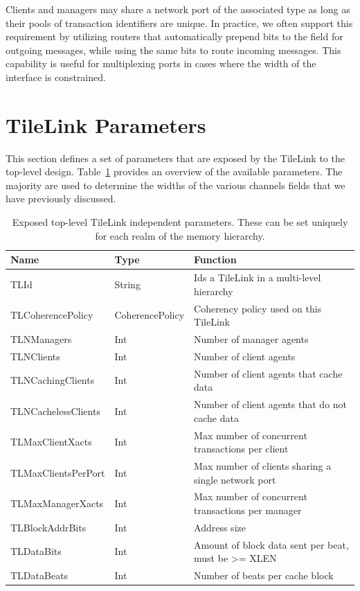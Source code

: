 Clients and managers may share a network port of the associated type as long as their pools of transaction identifiers are unique.
In practice, we often support this requirement by utilizing routers that automatically prepend bits to the  field
for outgoing messages, while using the same bits to route incoming messages.
This capability is useful for multiplexing ports in cases where the width of the interface is constrained.

\section{TileLink Parameters}
\label{s.tlparam}

This section defines a set of parameters that are exposed by the TileLink to the top-level design.
Table~\ref{tab:tlparams} provides an overview of the available parameters.
The majority are used to determine the widths of the various channels fields that we have previously discussed.

\begin{table}[t]
\begin{center}
\begin{tabular}{|l|l|l|}
    \hline
Name & Type & Function \\ \hline \hline
TLId & String & Ids a TileLink in a multi-level hierarchy \\ \hline
TLCoherencePolicy & CoherencePolicy & Coherency policy used on this TileLink \\ \hline
TLNManagers & Int & Number of manager agents \\ \hline
TLNClients & Int & Number of client agents \\ \hline
TLNCachingClients & Int & Number of client agents that cache data \\ \hline
TLNCachelessClients & Int & Number of client agents that do not cache data \\ \hline
TLMaxClientXacts & Int & Max number of concurrent transactions per client \\ \hline
TLMaxClientsPerPort & Int & Max number of clients sharing a single network port \\ \hline
TLMaxManagerXacts & Int & Max number of concurrent transactions per manager \\ \hline
TLBlockAddrBits & Int & Address size \\ \hline
TLDataBits & Int & Amount of block data sent per beat, must be >= XLEN \\ \hline
TLDataBeats & Int & Number of beats per cache block \\ \hline
\end{tabular}
\end{center}
\caption[Independent parameters of TileLink.]{
Exposed top-level TileLink independent parameters.
These can be set uniquely for each realm of the memory hierarchy.}
\label{tab:tlparams}
\end{table}

